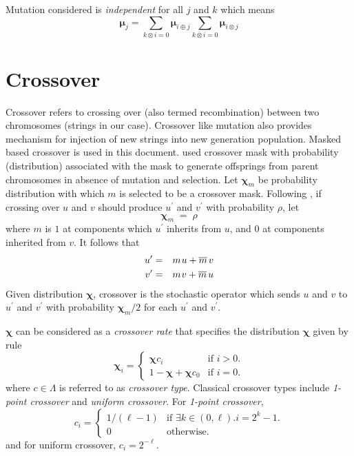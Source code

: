 Mutation considered is {\em independent} for all $j$ and $k$ which means \cite{VoseWright1998}
\[
\bm{\mu}_j = \sum\limits_{k\otimes i=0} \bm{\mu}_{i\oplus j} \sum\limits_{k\overline \otimes i=0} \bm{\mu}_{i\otimes j}
\]

\section{Crossover}
Crossover refers to crossing over (also termed recombination) between two chromosomes (strings in our case). Crossover like mutation also provides mechanism for injection of new strings into new generation population. Masked based crossover is used in this document. \cite{Geiringer1944} used crossover mask with probability (distribution) associated with the mask to generate offsprings from parent chromosomes in absence of mutation and selection. Let $\bm{\chi}_m$ be probability distribution with which $m$ is selected to be a crossover mask.
Following \cite{Geiringer1944}, if crossing over $u$ and $v$ should produce $u^\prime$ and $v^\prime$ with probability $\rho$, let
\[
\bm{\chi}_m \; = \; \rho
\]
where $m$ is $1$ at components which $u^\prime$ inherits from $u$, and
$0$ at components inherited from $v$.  It follows that\\[-0.3in]
\begin{eqnarray*}
u^\prime & = & m \nudge u + \overline{m} \nudge\nudge v \\
v^\prime & = & m \nudge v + \overline{m} \nudge\nudge u
\end{eqnarray*}
Given distribution $\bm{\chi}$, crossover is the stochastic operator which
sends $u$ and $v$ to $u^\prime$ and $v^\prime$ with probability $\bm{\chi}_m/2$ for each $u^\prime$ and $v^\prime$.

$\bm{\chi}$ can be considered as a {\em crossover rate} that specifies the distribution $\bm{\chi}$ given by rule \cite{VoseWright1998}
\[
  \bm{\chi}_i =\begin{cases}
    \bm{\chi}  c_i & \text{if $i>0$}.\\
    1 - \bm{\chi} + \bm{\chi}  c_0 & \text{if $i = 0$}.
  \end{cases}
\]
where $c \in \Lambda$ is referred to as {\em crossover type}. Classical crossover types include {\em 1-point crossover} and {\em uniform crossover}. For {\em 1-point crossover},
\[
  c_i =\begin{cases}
    1/(\ell - 1) & \text{if $\exists k \in (0, \ell).i = 2^k - 1$}.\\
    0 & \text{otherwise}.
  \end{cases}
\]
and for uniform crossover, $c_i = 2^{-\ell}$.

